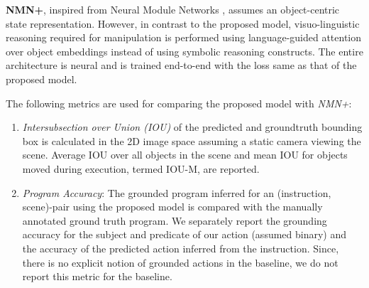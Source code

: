 \textbf{NMN+}, inspired from Neural Module Networks \cite{andreas2016neural}, assumes an object-centric state representation. However, in contrast to the proposed model, visuo-linguistic reasoning required for manipulation is performed using language-guided attention over object embeddings instead of using symbolic reasoning constructs. %
The entire architecture is neural and is trained end-to-end with the loss same as that of the proposed model. 





The following metrics are used for comparing the proposed model with \emph{NMN+}:
\begin{enumerate}
    \item \emph{Intersubsection over Union (IOU)} of the predicted and groundtruth bounding box is calculated in the 2D image space assuming a static camera viewing the scene. Average IOU over all objects in the scene and mean IOU for objects moved during execution, termed IOU-M,  are reported.
    \item \emph{Program Accuracy}: The grounded program inferred for an (instruction, scene)-pair using the proposed model is compared with the manually annotated ground truth program. We separately report the grounding accuracy for the subject and predicate of our action (assumed binary) and the accuracy of the predicted action inferred from the instruction. Since, there is no explicit notion of grounded actions in the baseline, we do not report this metric for the baseline. 
\end{enumerate}    

